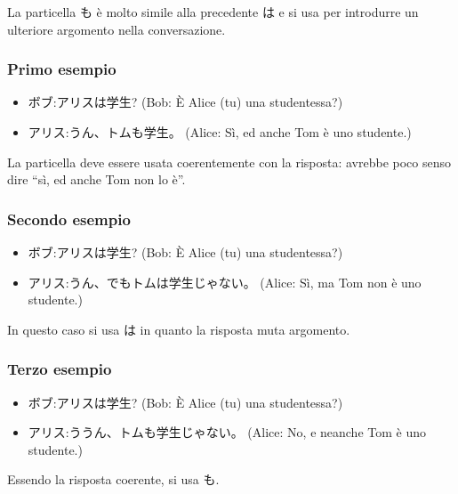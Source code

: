 \documentclass{article}
\let\jap\textjapanese
\begin{document}
            La particella \jap{も} è molto simile alla precedente \jap{は} e si usa per introdurre un ulteriore argomento nella
            conversazione.

            \subsubsection*{Primo esempio}

                \begin{itemize}
                    \item \jap{ボブ:アリスは学生?} (Bob: È Alice (tu) una studentessa?)
                    \item \jap{アリス:うん、トムも学生。} (Alice: Sì, ed anche Tom è uno studente.)
                \end{itemize}

                La particella deve essere usata coerentemente con la risposta: avrebbe poco senso dire ``sì, ed anche Tom non lo è''.

            \subsubsection*{Secondo esempio}

                \begin{itemize}
                    \item \jap{ボブ:アリスは学生?} (Bob: È Alice (tu) una studentessa?)
                    \item \jap{アリス:うん、でもトムは学生じゃない。} (Alice: Sì, ma Tom non è uno studente.)
                \end{itemize}

                In questo caso si usa \jap{は} in quanto la risposta muta argomento.

            \subsubsection*{Terzo esempio}

                \begin{itemize}
                    \item \jap{ボブ:アリスは学生?} (Bob: È Alice (tu) una studentessa?)
                    \item \jap{アリス:ううん、トムも学生じゃない。} (Alice: No, e neanche Tom è uno studente.)
                \end{itemize}

                Essendo la risposta coerente, si usa \jap{も}.
        
\end{document}
